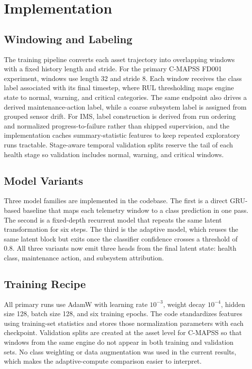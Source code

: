 \section{Implementation}
\subsection{Windowing and Labeling}
The training pipeline converts each asset trajectory into overlapping windows with a fixed history length and stride. For the primary C-MAPSS FD001 experiment, windows use length 32 and stride 8. Each window receives the class label associated with its final timestep, where RUL thresholding maps engine state to normal, warning, and critical categories. The same endpoint also drives a derived maintenance-action label, while a coarse subsystem label is assigned from grouped sensor drift. For IMS, label construction is derived from run ordering and normalized progress-to-failure rather than shipped supervision, and the implementation caches summary-statistic features to keep repeated exploratory runs tractable. Stage-aware temporal validation splits reserve the tail of each health stage so validation includes normal, warning, and critical windows.

\subsection{Model Variants}
Three model families are implemented in the codebase. The first is a direct GRU-based baseline that maps each telemetry window to a class prediction in one pass. The second is a fixed-depth recurrent model that repeats the same latent transformation for six steps. The third is the adaptive model, which reuses the same latent block but exits once the classifier confidence crosses a threshold of 0.8. All three variants now emit three heads from the final latent state: health class, maintenance action, and subsystem attribution.

\subsection{Training Recipe}
All primary runs use AdamW with learning rate $10^{-3}$, weight decay $10^{-4}$, hidden size 128, batch size 128, and six training epochs. The code standardizes features using training-set statistics and stores those normalization parameters with each checkpoint. Validation splits are created at the asset level for C-MAPSS so that windows from the same engine do not appear in both training and validation sets. No class weighting or data augmentation was used in the current results, which makes the adaptive-compute comparison easier to interpret.

